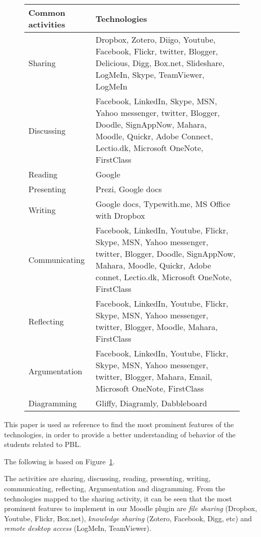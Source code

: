 \begin{figure}		
\begin{tabular}{|p{3cm}|p{}|}
\hline
Common activities & Technologies \\ \hline
Sharing & Dropbox, Zotero, Diigo, Youtube, Facebook, Flickr, twitter, Blogger, Delicious, Digg, Box.net, Slideshare, LogMeIn, Skype, 
TeamViewer, LogMeIn  \\ \hline
Discussing & Facebook, LinkedIn, Skype, MSN, Yahoo messenger, twitter, Blogger, Doodle, SignAppNow, Mahara, Moodle, Quickr, Adobe Connect, Lectio.dk, Microsoft OneNote, FirstClass \\ \hline
Reading & Google \\ \hline
Presenting & Prezi, Google docs \\ \hline
Writing & Google docs, Typewith.me, MS Office with Dropbox \\ \hline
Communicating & Facebook, LinkedIn, Youtube, Flickr, Skype, MSN, Yahoo messenger, twitter, Blogger, Doodle, SignAppNow, Mahara, Moodle, Quickr, Adobe connet, Lectio.dk, Microsoft OneNote, FirstClass \\ \hline
Reflecting & Facebook, LinkedIn, Youtube, Flickr, Skype, MSN, Yahoo messenger, twitter, Blogger, Moodle, Mahara, FirstClass \\ \hline
Argumentation & Facebook, LinkedIn, Youtube, Flickr, Skype, MSN, Yahoo messenger, twitter, Blogger, Mahara, Email, Microsoft OneNote, FirstClass \\ \hline
Diagramming & Gliffy, Diagramly, Dabbleboard \\ \hline

\end{tabular}
\label{tab:figure3}
\end{figure}


This paper is used as reference to find the most prominent features of the technologies, in order to provide a better understanding of behavior of the students related to PBL.

The following is based on Figure~\ref{tab:figure3}.

The activities are sharing, discussing, reading, presenting, writing, communicating, reflecting, Argumentation and diagramming.
From the technologies mapped to the sharing activity, it can be seen that the most prominent features to implement in our Moodle plugin are \textit{file sharing} (Dropbox, Youtube, Flickr, Box.net), \textit{knowledge sharing} (Zotero, Facebook, Digg, etc) and \textit{remote desktop access} (LogMeIn, TeamViewer).

